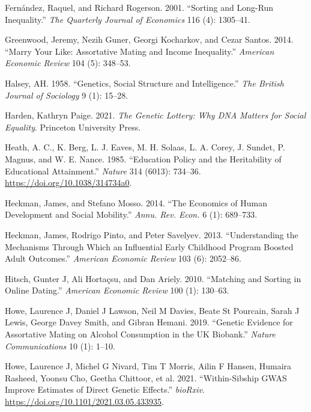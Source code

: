 \documentclass[
]{article}
\newlength{\cslhangindent}
\newlength{\cslentryspacingunit} %
\newenvironment{CSLReferences}[2] %
 {%
  \setlength{\parindent}{0pt}
  \ifodd #1
  \let\oldpar\par
  \def\par{\hangindent=\cslhangindent\oldpar}
  \fi
  \setlength{\parskip}{#2\cslentryspacingunit}
 }%
 {}
\theoremstyle{definition}
\theoremstyle{definition}
\theoremstyle{definition}
\theoremstyle{definition}
\theoremstyle{remark}
\begin{document}
\begin{CSLReferences}{1}{0}
\leavevmode{}%
Fernández, Raquel, and Richard Rogerson. 2001. {``Sorting and Long-Run Inequality.''} \emph{The Quarterly Journal of Economics} 116 (4): 1305--41.

\leavevmode{}%
Greenwood, Jeremy, Nezih Guner, Georgi Kocharkov, and Cezar Santos. 2014. {``Marry Your Like: Assortative Mating and Income Inequality.''} \emph{American Economic Review} 104 (5): 348--53.

\leavevmode{}%
Halsey, AH. 1958. {``Genetics, Social Structure and Intelligence.''} \emph{The British Journal of Sociology} 9 (1): 15--28.

\leavevmode{}%
Harden, Kathryn Paige. 2021. \emph{The Genetic Lottery: Why DNA Matters for Social Equality}. Princeton University Press.

\leavevmode{}%
Heath, A. C., K. Berg, L. J. Eaves, M. H. Solaas, L. A. Corey, J. Sundet, P. Magnus, and W. E. Nance. 1985. {``Education Policy and the Heritability of Educational Attainment.''} \emph{Nature} 314 (6013): 734--36. \url{https://doi.org/10.1038/314734a0}.

\leavevmode{}%
Heckman, James, and Stefano Mosso. 2014. {``The Economics of Human Development and Social Mobility.''} \emph{Annu. Rev. Econ.} 6 (1): 689--733.

\leavevmode{}%
Heckman, James, Rodrigo Pinto, and Peter Savelyev. 2013. {``Understanding the Mechanisms Through Which an Influential Early Childhood Program Boosted Adult Outcomes.''} \emph{American Economic Review} 103 (6): 2052--86.

\leavevmode{}%
Hitsch, Gunter J, Ali Hortaçsu, and Dan Ariely. 2010. {``Matching and Sorting in Online Dating.''} \emph{American Economic Review} 100 (1): 130--63.

\leavevmode{}%
Howe, Laurence J, Daniel J Lawson, Neil M Davies, Beate St Pourcain, Sarah J Lewis, George Davey Smith, and Gibran Hemani. 2019. {``Genetic Evidence for Assortative Mating on Alcohol Consumption in the UK Biobank.''} \emph{Nature Communications} 10 (1): 1--10.

\leavevmode{}%
Howe, Laurence J, Michel G Nivard, Tim T Morris, Ailin F Hansen, Humaira Rasheed, Yoonsu Cho, Geetha Chittoor, et al. 2021. {``Within-Sibship GWAS Improve Estimates of Direct Genetic Effects.''} \emph{bioRxiv}. \url{https://doi.org/10.1101/2021.03.05.433935}.


\end{CSLReferences}
\end{document}
